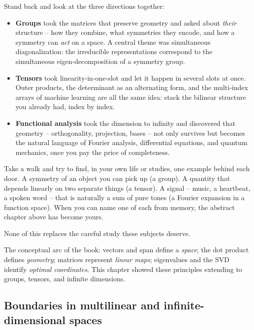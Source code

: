 Stand back and look at the three directions together:

\begin{itemize}
  \item \textbf{Groups} took the matrices that preserve geometry and asked about
        \emph{their} structure -- how they combine, what symmetries they encode,
        and how a symmetry can \emph{act} on a space. A central theme was
        simultaneous diagonalization: the irreducible representations correspond
        to the simultaneous eigen-decomposition of a symmetry group.
  \item \textbf{Tensors} took linearity-in-one-slot and let it happen in several
        slots at once. Outer products, the determinant as an alternating form, and
        the multi-index arrays of machine learning are all the same idea: stack the
        bilinear structure you already had, index by index.
  \item \textbf{Functional analysis} took the dimension to infinity and discovered
        that geometry -- orthogonality, projection, bases -- not only survives but
        becomes the natural language of Fourier analysis, differential equations,
        and quantum mechanics, once you pay the price of completeness.
\end{itemize}

\begin{walkbox}
Take a walk and try to find, in your own life or studies, one example behind each
door. A symmetry of an object you can pick up (a group). A quantity that depends
linearly on two separate things (a tensor). A signal -- music, a heartbeat, a
spoken word -- that is naturally a sum of pure tones (a Fourier expansion in a
function space). When you can name one of each from memory, the abstract chapter
above has become yours.
\end{walkbox}

None of this replaces the careful study these subjects deserve.

\begin{focusbox}
The conceptual arc of the book: vectors and span define a \emph{space};
the dot product defines \emph{geometry}; matrices represent \emph{linear maps};
eigenvalues and the SVD identify \emph{optimal coordinates}. This chapter showed
these principles extending to groups, tensors, and infinite dimensions.
\end{focusbox}

\subsection*{Boundaries in multilinear and infinite-dimensional spaces}

